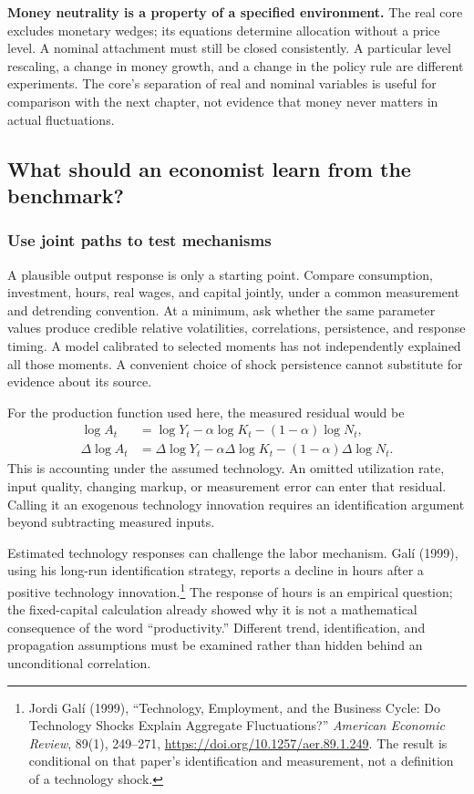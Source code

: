 \begin{blueblock}
\textbf{Money neutrality is a property of a specified environment.}
The real core excludes monetary wedges; its equations determine allocation
without a price level. A nominal attachment must still be closed consistently.
A particular level rescaling, a change in money growth, and a change in the
policy rule are different experiments. The core's separation of real and
nominal variables is useful for comparison with the next chapter, not evidence
that money never matters in actual fluctuations.
\end{blueblock}

\subsection{What should an economist learn from the benchmark?}

\subsubsection{Use joint paths to test mechanisms}

A plausible output response is only a starting point. Compare consumption,
investment, hours, real wages, and capital jointly, under a common measurement
and detrending convention. At a minimum, ask whether the same parameter values
produce credible relative volatilities, correlations, persistence, and response
timing. A model calibrated to selected moments has not independently explained
all those moments. A convenient choice of shock persistence cannot substitute
for evidence about its source.

For the production function used here, the measured residual would be
\begin{align}
\log A_t&=\log Y_t-\alpha\log K_t-(1-\alpha)\log N_t,\\
\Delta\log A_t&=\Delta\log Y_t-\alpha\Delta\log K_t
 -(1-\alpha)\Delta\log N_t.
\end{align}
This is accounting under the assumed technology. An omitted utilization rate,
input quality, changing markup, or measurement error can enter that residual.
Calling it an exogenous technology innovation requires an identification
argument beyond subtracting measured inputs.

Estimated technology responses can challenge the labor mechanism. Gal\'i
(1999), using his long-run identification strategy, reports a decline in hours
after a positive technology innovation.\footnote{Jordi Gal\'i (1999),
``Technology, Employment, and the Business Cycle: Do Technology Shocks Explain
Aggregate Fluctuations?'' \textit{American Economic Review}, 89(1), 249--271,
\url{https://doi.org/10.1257/aer.89.1.249}. The result is conditional on that
paper's identification and measurement, not a definition of a technology shock.}
The response of hours is an empirical question; the fixed-capital calculation
already showed why it is not a mathematical consequence of the word
``productivity.'' Different trend, identification, and propagation assumptions
must be examined rather than hidden behind an unconditional correlation.

